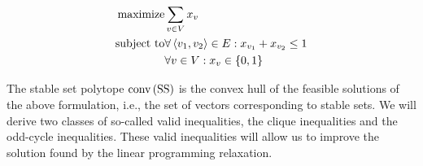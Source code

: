 \begin{eqnarray}
\mbox{maximize}&\sumdomain[v]{V}{x_v}\eqnlab{stablesetr-m}\\
\mbox{subject to}&\forall\tupl{v_1,v_2}\in E:x_{v_1}+x_{v_2}\leq 1\eqnlab{stablesetr-c1}\\
&\forall v\in V:x_v\in\accl{0,1}\eqnlab{stablesetr-c2}
\end{eqnarray}

The stable set polytope $\mbox{conv}\left( \mbox{SS} \right)$ is the convex hull of the feasible solutions of the above formulation, i.e., the set of vectors corresponding to stable sets. We will derive two classes of so-called valid inequalities, the clique inequalities and the odd-cycle inequalities. These valid inequalities will allow us to improve the solution found by the linear programming relaxation.

